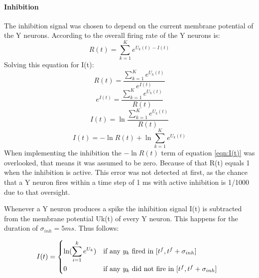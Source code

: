 \paragraph{Inhibition}
The inhibition signal was chosen to depend on the current membrane potential of the Y neurons. According to \citet{nessler} the overall firing rate of the Y neurons is:
\begin{equation}
\label{eqn:R}
R(t) = \sum_{k=1}^K e^{U_k(t) - I(t)}
\end{equation}
Solving this equation for I(t):
\begin{equation}
\label{}
R(t) = \frac{ \sum_{k=1}^K e^{U_k(t)}}{e^{I(t)}}
\end{equation}
\begin{equation}
\label{}
e^{I(t)} = \frac{\sum_{k=1}^K e^{U_k(t)}}{R(t)}
\end{equation}
\begin{equation}
\label{}
I(t) = \ln{ \frac{ \sum_{k=1}^K e^{U_k(t)}}{R(t)}}
\end{equation}
\begin{equation}
\label{eqn:I(t)}
I(t) =  - \ln{R(t)} + \ln{  \sum_{k=1}^K e^{U_k(t)}}
\end{equation}
When implementing the inhibition the $- \ln{R(t)}$ term of equation \ref{eqn:I(t)} was overlooked, that means it was assumed to be zero. Because of that R(t) equals 1 when the inhibition is active. This error was not detected at first, as the chance that a Y neuron fires within a time step of 1 ms with active inhibition is 1/1000 due to that oversight.

Whenever a Y neuron produces a spike the inhibition signal I(t) is subtracted from the membrane potential Uk(t) of every Y neuron. This happens for the duration of $\sigma_{inh} = 5 ms$. Thus follows:

\begin{equation}
\label{eqn:iinh}
I(t) = \begin{dcases*} \ln ( \sum_{i=1}^k e^{U_k} ) & if any $y_k$ fired in $ [t^f, t^f  + \sigma_{inh}] $ \\
0 & \text{if any $y_k$ did not fire in $ [t^f, t^f + \sigma_{inh}] $ } \end{dcases*}\end{equation}

